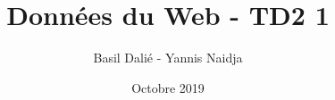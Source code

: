 \documentclass{report}
\title{Données du Web - TD2 1}
\author{Basil Dalié - Yannis Naidja}
\date{Octobre 2019}
\begin{document}
\maketitle









\begin{appendix}
  
  
  
\end{appendix}
\end{document}

